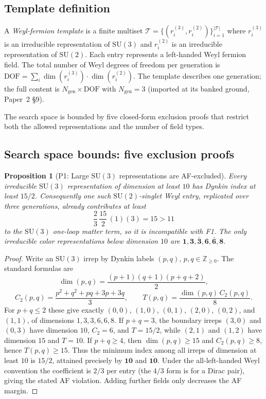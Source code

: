 \documentclass[11pt]{article}
\newtheorem{proposition}[theorem]{Proposition}
\theoremstyle{definition}
\newcommand{\SU}{\mathrm{SU}}
\begin{document}

\subsection{Template definition}
\label{sec:template_def}

A \emph{Weyl-fermion template} is a finite multiset
$\mathcal{T} = \{(r_i^{(3)}, r_i^{(2)})\}_{i=1}^{|\mathcal{T}|}$
where $r_i^{(3)}$ is an irreducible representation of $\SU(3)$ and
$r_i^{(2)}$ is an irreducible representation of $\SU(2)$.  Each entry
represents a left-handed Weyl fermion field.  The total number of Weyl
degrees of freedom per generation is
$\mathrm{DOF} = \sum_i \dim(r_i^{(3)}) \cdot \dim(r_i^{(2)})$.
The template describes one generation; the full content is
$N_{\mathrm{gen}} \times \mathrm{DOF}$ with $N_{\mathrm{gen}} = 3$
(imported at its banked ground, Paper~2 \S9).

The search space is bounded by five closed-form exclusion proofs that
restrict both the allowed representations and the number of field types.


\subsection{Search space bounds: five exclusion proofs}
\label{sec:exclusion_proofs}

\begin{proposition}[P1: Large $\SU(3)$ representations are AF-excluded]
\label{prop:P1}
Every irreducible $\SU(3)$ representation of dimension at least $10$
has Dynkin index at least $15/2$.  Consequently one such
$\SU(2)$-singlet Weyl entry, replicated over three generations,
already contributes at least
\[
  \frac{2}{3}\,\frac{15}{2}\,(1)(3)=15>11
\]
to the $\SU(3)$ one-loop matter term, so it is incompatible with F1.
The only irreducible color representations below dimension $10$ are
$\mathbf1,\mathbf3,\bar{\mathbf3},\mathbf6,\bar{\mathbf6},\mathbf8$.
\end{proposition}

\begin{proof}
Write an $\SU(3)$ irrep by Dynkin labels $(p,q)$, $p,q\in\mathbb Z_{\ge0}$.
The standard formulas are~\cite{FultonHarris1991}
\[
 \dim(p,q)=\frac{(p+1)(q+1)(p+q+2)}{2},
\]
\[
 C_2(p,q)=\frac{p^2+q^2+pq+3p+3q}{3},
 \qquad
 T(p,q)=\frac{\dim(p,q)\,C_2(p,q)}{8}.
\]
For $p+q\le2$ these give exactly
$(0,0)$, $(1,0)$, $(0,1)$, $(2,0)$, $(0,2)$, and $(1,1)$, of dimensions
$1,3,3,6,6,8$.  If $p+q=3$, the boundary irreps
$(3,0)$ and $(0,3)$ have dimension $10$, $C_2=6$, and
$T=15/2$, while $(2,1)$ and $(1,2)$ have dimension $15$ and
$T=10$.  If $p+q\ge4$, then $\dim(p,q)\ge15$ and
$C_2(p,q)\ge8$, hence $T(p,q)\ge15$.  Thus the minimum index among
all irreps of dimension at least $10$ is $15/2$, attained precisely by
$\mathbf{10}$ and $\overline{\mathbf{10}}$.  Under the all-left-handed
Weyl convention the coefficient is $2/3$ per entry (the $4/3$ form is
for a Dirac pair), giving the stated AF violation.  Adding further
fields only decreases the AF margin.
\end{proof}
\end{document}
